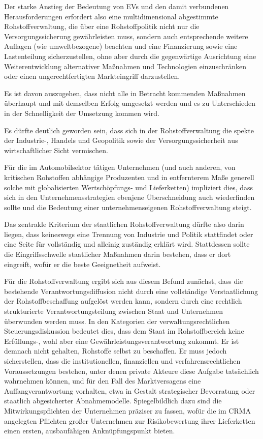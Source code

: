 \documentclass[12pt,a4paper,oneside]{book} %
\begin{document}
{Der starke Anstieg der Bedeutung von EVs und den damit verbundenen Herausforderungen erfordert also eine multidimensional abgestimmte Rohstoffverwaltung, die über eine Rohstoffpolitik nicht nur die Versorgungssicherung gewährleisten muss, sondern auch entsprechende weitere Auflagen (wie umweltbezogene) beachten und eine Finanzierung sowie eine Lastenteilung sicherzustellen, ohne aber durch die gegenwärtige Ausrichtung eine Weiterentwicklung alternativer Maßnahmen und Technologien einzuschränken oder einen ungerechtfertigten Markteingriff darzustellen.

Es ist davon auszugehen, dass nicht alle in Betracht kommenden Maßnahmen überhaupt und mit demselben Erfolg umgesetzt werden und es zu Unterschieden in der Schnelligkeit der Umsetzung kommen wird.

Es dürfte deutlich geworden sein, dass sich in der Rohstoffverwaltung die spekte der Industrie-, Handels und Geopolitik sowie der Versorgungssicherheit aus wirtschaftlicher Sicht vermischen.

Für die im Automobilsektor tätigen Unternehmen (und auch anderen, von kritischen Rohstoffen abhängige Produzenten und in entfernterem Maße generell solche mit globalisierten Wertschöpfungs- und Lieferketten) impliziert dies, dass sich in den Unternehmensstrategien ebenjene Überschneidung auch wiederfinden sollte und die Bedeutung einer unternehmenseigenen Rohstoffverwaltung steigt. 

Das zentrakle Kriterium der staatlichen Rohstoffverwaltung dürfte also darin liegen, dass keineswegs eine Trennung von Industrie und Politik stattfindet oder eine Seite für vollständig und alleinig zuständig erklärt wird. Stattdessen sollte die Eingriffsschwelle staatlicher Maßnahmen darin bestehen, dass er dort eingreift, wofür er die beste Geeignetheit aufweist.

Für die Rohstoffverwaltung ergibt sich aus diesem Befund zunächst, dass die bestehende Verantwortungsdiffusion nicht durch eine vollständige Verstaatlichung der Rohstoffbeschaffung aufgelöst werden kann, sondern durch eine rechtlich strukturierte Verantwortungsteilung zwischen Staat und Unternehmen überwunden werden muss. In den Kategorien der verwaltungsrechtlichen Steuerungsdiskussion bedeutet dies, dass dem Staat im Rohstoffbereich keine Erfüllungs-, wohl aber eine Gewährleistungsverantwortung zukommt. Er ist demnach nicht gehalten, Rohstoffe selbst zu beschaffen. Er muss jedoch sicherstellen, dass die institutionellen, finanziellen und verfahrensrechtlichen Voraussetzungen bestehen, unter denen private Akteure diese Aufgabe tatsächlich wahrnehmen können, und für den Fall des Marktversagens eine Auffangverantwortung vorhalten, etwa in Gestalt strategischer Bevorratung oder staatlich abgesicherter Abnahmemodelle. Spiegelbildlich dazu sind die Mitwirkungspflichten der Unternehmen präziser zu fassen, wofür die im CRMA angelegten Pflichten großer Unternehmen zur Risikobewertung ihrer Lieferketten einen ersten, ausbaufähigen Anknüpfungspunkt bieten.

}
\end{document}
